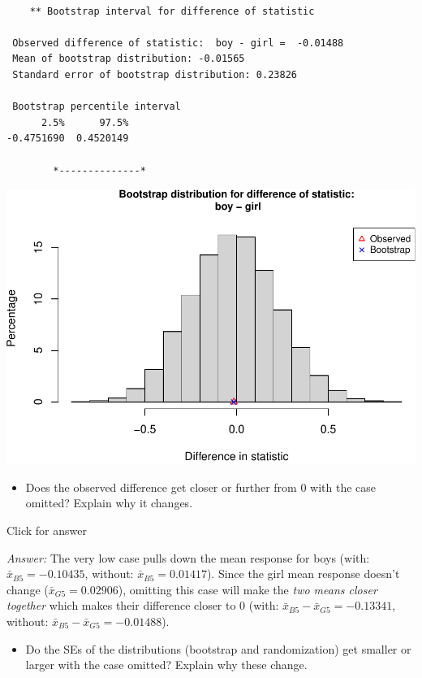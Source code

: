 \documentclass[
]{book}
\providecommand{\tightlist}{%
  \setlength{\itemsep}{0pt}\setlength{\parskip}{0pt}}
\begin{document}
\begin{verbatim}

    ** Bootstrap interval for difference of statistic

 Observed difference of statistic:  boy - girl =  -0.01488 
 Mean of bootstrap distribution: -0.01565 
 Standard error of bootstrap distribution: 0.23826 

 Bootstrap percentile interval
      2.5%      97.5% 
-0.4751690  0.4520149 

        *--------------*
\end{verbatim}

\includegraphics[width=1\linewidth]{Class_Activity_14_files/figure-latex/unnamed-chunk-11-2}

\begin{itemize}
\tightlist
\item
  Does the observed difference get closer or further from 0 with the case omitted? Explain why it changes.
\end{itemize}

Click for answer

\emph{Answer:} The very low case pulls down the mean response for boys (with: \(\bar{x}_{B5} = -0.10435\), without: \(\bar{x}_{B5} = 0.01417\)). Since the girl mean response doesn't change (\(\bar{x}_{G5} = 0.02906\)), omitting this case will make the \emph{two means closer together} which makes their difference closer to 0 (with: \(\bar{x}_{B5} - \bar{x}_{G5} = -0.13341\), without: \(\bar{x}_{B5} - \bar{x}_{G5} = -0.01488\)).

\begin{itemize}
\tightlist
\item
  Do the SEs of the distributions (bootstrap and randomization) get smaller or larger with the case omitted? Explain why these change.
\end{itemize}
\end{document}
